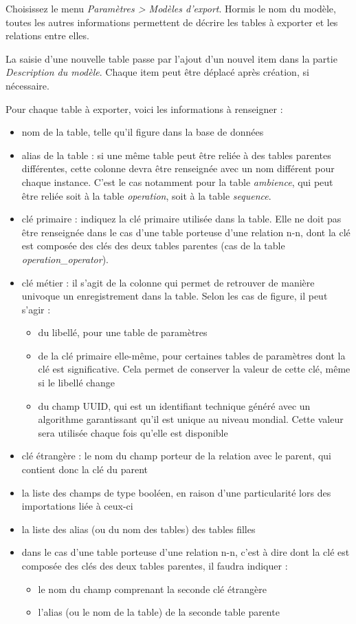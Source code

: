 Choisissez le menu \textit{Paramètres > Modèles d'export}. Hormis le nom du modèle, toutes les autres informations permettent de décrire les tables à exporter et les relations entre elles.

La saisie d'une nouvelle table passe par l'ajout d'un nouvel item dans la partie \textit{Description du modèle}. Chaque item peut être déplacé après création, si nécessaire.

Pour chaque table à exporter, voici les informations à renseigner :
\begin{itemize}
	\item nom de la table, telle qu'il figure dans la base de données
	\item alias de la table : si une même table peut être reliée à des tables parentes différentes, cette colonne devra être renseignée avec un nom différent pour chaque instance. C'est le cas notamment pour la table \textit{ambience}, qui peut être reliée soit à la table \textit{operation}, soit à la table \textit{sequence}.
	\item  clé primaire : indiquez la clé primaire utilisée dans la table. Elle ne doit pas être renseignée dans le cas d'une table porteuse d'une relation n-n, dont la clé est composée des clés des deux tables parentes (cas de la table \textit{operation\_operator}).
	\item clé métier : il s'agit de la colonne qui permet de retrouver de manière univoque un enregistrement dans la table. Selon les cas de figure, il peut s'agir :
	\begin{itemize}
		\item du libellé, pour une table de paramètres
		\item de la clé primaire elle-même, pour certaines tables de paramètres dont la clé est significative. Cela permet de conserver la valeur de cette clé, même si le libellé change
		\item du champ UUID, qui est un identifiant technique généré avec un algorithme garantissant qu'il est unique au niveau mondial. Cette valeur sera utilisée chaque fois qu'elle est disponible
	\end{itemize}
	\item clé étrangère : le nom du champ porteur de la relation avec le parent, qui contient donc la clé du parent
	\item la liste des champs de type booléen, en raison d'une particularité lors des importations liée à ceux-ci
	\item la liste des alias (ou du nom des tables) des tables filles
	\item dans le cas d'une table porteuse d'une relation n-n, c'est à dire dont la clé est composée des clés des deux tables parentes, il faudra indiquer :
	\begin{itemize}
		\item le nom du champ comprenant la seconde clé étrangère
		\item l'alias (ou le nom de la table) de la seconde table parente
	\end{itemize}
\end{itemize}

